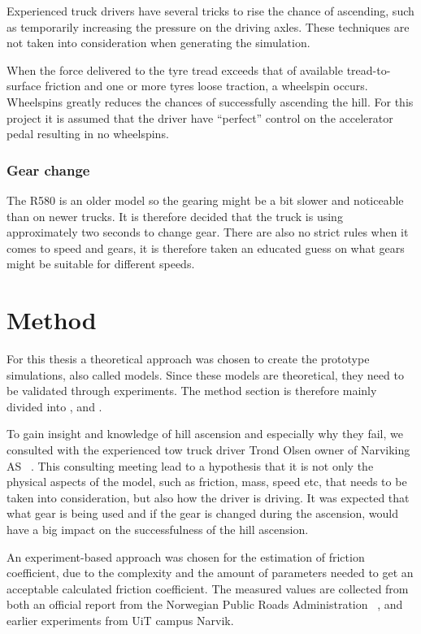 \documentclass[noprint]{uit-thesis}
\begin{document}
\par
Experienced truck drivers have several tricks to rise the chance of ascending, such as temporarily increasing the pressure on the driving axles. These techniques are not taken into consideration when generating the simulation. 
\par
When the force delivered to the tyre tread exceeds that of available tread-to-surface friction and one or more tyres loose traction, a wheelspin occurs. Wheelspins greatly reduces the chances of successfully ascending the hill. For this project it is assumed that the driver have “perfect” control on the accelerator pedal resulting in no wheelspins. 

\subsection{Gear change}
The R580 is an older model so the gearing might be a bit slower and noticeable than on newer trucks. It is therefore decided that the truck is using approximately two seconds to change gear. There are also no strict rules when it comes to speed and gears, it is therefore taken an educated guess on what gears might be suitable for different speeds. 


\chapter{Method}
For this thesis a theoretical approach was chosen to create the prototype simulations, also called models. Since these models are theoretical, they need to be validated through experiments. The method section is therefore mainly divided into ,  and .
\par
To gain insight and knowledge of hill ascension and especially why they fail, we consulted with the experienced tow truck driver Trond Olsen owner of Narviking AS ~\citep{narviking}. This consulting meeting lead to a hypothesis that it is not only the physical aspects of the model, such as friction, mass, speed etc, that needs to be taken into consideration, but also how the driver is driving. It was expected that what gear is being used and if the gear is changed during the ascension, would have a big impact on the successfulness of the hill ascension.
\par
An experiment-based approach was chosen for the estimation of friction coefficient, due to the complexity and the amount of parameters needed to get an acceptable calculated friction coefficient. The measured values are collected from both an official report from the Norwegian Public Roads Administration ~\citep{vegvesene}, and earlier experiments from UiT campus Narvik.
\end{document}

